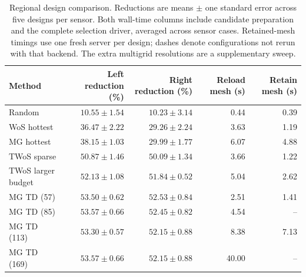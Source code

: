 \begin{table}[t]
\centering\small
\caption{Regional design comparison. Reductions are means $\pm$ one standard error across five designs per sensor. Both wall-time columns include candidate preparation and the complete selection driver, averaged across sensor cases. Retained-mesh timings use one fresh server per design; dashes denote configurations not rerun with that backend. The extra multigrid resolutions are a supplementary sweep.}
\label{tab:regional}
\begin{tabular}{lrrrr}
\toprule
Method & Left reduction (\%) & Right reduction (\%) & Reload mesh (s) & Retain mesh (s) \\
\midrule
Random & $10.55\pm1.54$ & $10.23\pm3.14$ & 0.44 & 0.39 \\
WoS hottest & $36.47\pm2.22$ & $29.26\pm2.24$ & 3.63 & 1.19 \\
MG hottest & $38.15\pm1.03$ & $29.99\pm1.77$ & 6.07 & 4.88 \\
TWoS sparse & $50.87\pm1.46$ & $50.09\pm1.34$ & 3.66 & 1.22 \\
TWoS larger budget & $52.13\pm1.08$ & $51.84\pm0.52$ & 5.04 & 2.62 \\
MG TD (57) & $53.50\pm0.62$ & $52.53\pm0.84$ & 2.51 & 1.41 \\
MG TD (85) & $53.57\pm0.66$ & $52.45\pm0.82$ & 4.54 & -- \\
MG TD (113) & $53.30\pm0.57$ & $52.15\pm0.88$ & 8.38 & 7.13 \\
MG TD (169) & $53.57\pm0.66$ & $52.15\pm0.88$ & 40.00 & -- \\
\bottomrule
\end{tabular}
\end{table}

